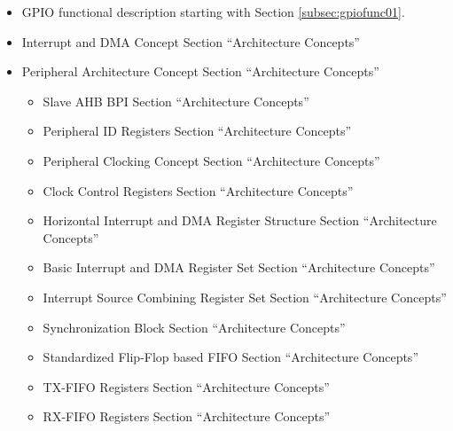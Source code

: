 \begin{itemize}
  \item GPIO functional description starting with Section \ref{subsec:gpiofunc01}.
  \item Interrupt and DMA Concept Section ``Architecture Concepts''
  \item Peripheral Architecture Concept Section ``Architecture Concepts''
  \begin{itemize}
    \item Slave AHB BPI Section ``Architecture Concepts''
    \item Peripheral ID Registers Section ``Architecture Concepts''
    \item Peripheral Clocking Concept Section ``Architecture Concepts''
    \item Clock Control Registers Section ``Architecture Concepts''
    \item Horizontal Interrupt and DMA Register Structure Section ``Architecture Concepts''
    \item Basic Interrupt and DMA Register Set Section ``Architecture Concepts''
    \item Interrupt Source Combining Register Set Section ``Architecture Concepts''
    \item Synchronization Block Section ``Architecture Concepts''
    \item Standardized Flip-Flop based FIFO Section ``Architecture Concepts''
    \item TX-FIFO Registers Section ``Architecture Concepts''
    \item RX-FIFO Registers Section ``Architecture Concepts''
  \end{itemize}
\end{itemize}
